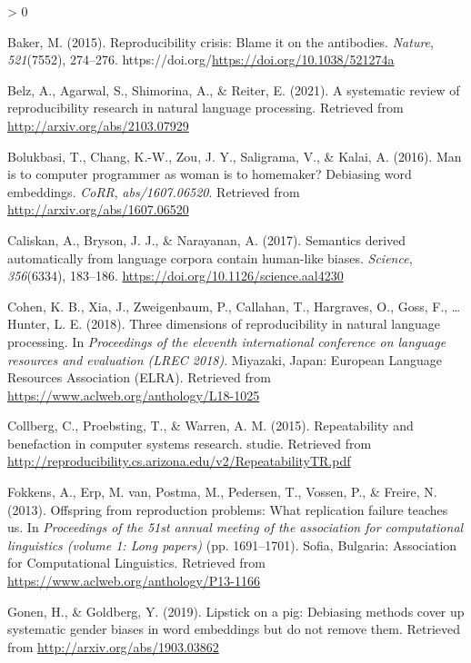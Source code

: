 \documentclass[
  english,
  man,floatsintext]{apa6}
\newlength{\cslhangindent}
\newenvironment{CSLReferences}[2] %
 {%
  \setlength{\parindent}{0pt}
  \ifodd #1 \everypar{\setlength{\hangindent}{\cslhangindent}}\ignorespaces\fi
  \ifnum #2 > 0
  \setlength{\parskip}{#2\baselineskip}
  \fi
 }%
 {}
\begin{document}
\hypertarget{refs}{}
\begin{CSLReferences}{1}{0}
\leavevmode\hypertarget{ref-baker_2015}{}%
Baker, M. (2015). Reproducibility crisis: Blame it on the antibodies. \emph{Nature}, \emph{521}(7552), 274--276. https://doi.org/\url{https://doi.org/10.1038/521274a}

\leavevmode\hypertarget{ref-belz_2021}{}%
Belz, A., Agarwal, S., Shimorina, A., \& Reiter, E. (2021). A systematic review of reproducibility research in natural language processing. Retrieved from \url{http://arxiv.org/abs/2103.07929}

\leavevmode\hypertarget{ref-bolukbasi_2016}{}%
Bolukbasi, T., Chang, K.-W., Zou, J. Y., Saligrama, V., \& Kalai, A. (2016). Man is to computer programmer as woman is to homemaker? Debiasing word embeddings. \emph{CoRR}, \emph{abs/1607.06520}. Retrieved from \url{http://arxiv.org/abs/1607.06520}

\leavevmode\hypertarget{ref-caliskan_2017}{}%
Caliskan, A., Bryson, J. J., \& Narayanan, A. (2017). Semantics derived automatically from language corpora contain human-like biases. \emph{Science}, \emph{356}(6334), 183--186. \url{https://doi.org/10.1126/science.aal4230}

\leavevmode\hypertarget{ref-cohen_2018}{}%
Cohen, K. B., Xia, J., Zweigenbaum, P., Callahan, T., Hargraves, O., Goss, F., \ldots{} Hunter, L. E. (2018). Three dimensions of reproducibility in natural language processing. In \emph{Proceedings of the eleventh international conference on language resources and evaluation ({LREC} 2018)}. Miyazaki, Japan: European Language Resources Association (ELRA). Retrieved from \url{https://www.aclweb.org/anthology/L18-1025}

\leavevmode\hypertarget{ref-collberg_2015}{}%
Collberg, C., Proebsting, T., \& Warren, A. M. (2015). Repeatability and benefaction in computer systems research. studie. Retrieved from \url{http://reproducibility.cs.arizona.edu/v2/RepeatabilityTR.pdf}

\leavevmode\hypertarget{ref-fokkens_2013}{}%
Fokkens, A., Erp, M. van, Postma, M., Pedersen, T., Vossen, P., \& Freire, N. (2013). Offspring from reproduction problems: What replication failure teaches us. In \emph{Proceedings of the 51st annual meeting of the association for computational linguistics (volume 1: Long papers)} (pp. 1691--1701). Sofia, Bulgaria: Association for Computational Linguistics. Retrieved from \url{https://www.aclweb.org/anthology/P13-1166}

\leavevmode\hypertarget{ref-gonen_2019}{}%
Gonen, H., \& Goldberg, Y. (2019). Lipstick on a pig: Debiasing methods cover up systematic gender biases in word embeddings but do not remove them. Retrieved from \url{http://arxiv.org/abs/1903.03862}


\end{CSLReferences}
\end{document}
